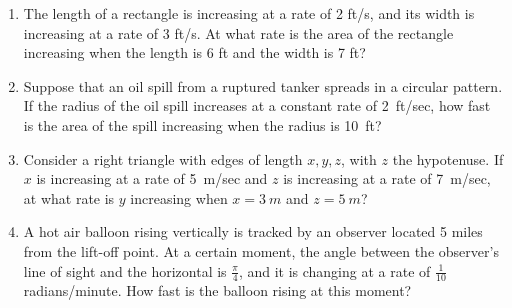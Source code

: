 \documentclass[10pt]{scrartcl}
\theoremstyle{definition}
\begin{document}
\begin{enumerate}
\item[2017 Spring Exam 2] The length of a rectangle is increasing at a rate of 2 ft/s, and its width is increasing at a rate of 3 ft/s. At what rate is the area of the rectangle increasing when the length is 6 ft and the width is 7 ft?
\item[2017 Spring Final] Suppose that an oil spill from a ruptured tanker spreads in a circular pattern. If the radius of the oil spill increases at a constant rate of \SI{2}{ft/sec}, how fast is the area of the spill increasing when the radius is \SI{10}{ft}?
\item[2016 Fall Final] Consider a right triangle with edges of length $x, y, z$, with $z$ the hypotenuse. If $x$ is increasing at a rate of \SI{5}{m/sec} and $z$ is increasing at a rate of \SI{7}{m/sec}, at what rate is $y$ increasing when $x = \SI{3}{m}$ and $z = \SI{5}{m}$?
\item[2016 Spring Final] A hot air balloon rising vertically is tracked by an observer located 5 miles from the lift-off point. At a certain moment, the angle between the observer's line of sight and the horizontal is $\frac \pi 4$, and it is changing at a rate of $\frac{1}{10}$ radians/minute. How fast is the balloon rising at this moment?
\end{enumerate}
\end{document}
